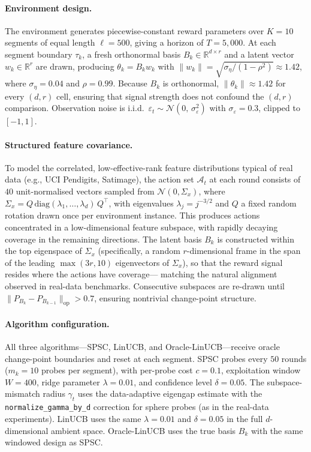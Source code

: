 \documentclass{article}
\newcommand{\R}{\mathbb{R}}
\newcommand{\cA}{\mathcal{A}}
\begin{document}
{\paragraph{Environment design.}
The environment generates piecewise-constant reward parameters over
$K = 10$ segments of equal length $\ell = 500$, giving a horizon of
$T = 5{,}000$.
At each segment boundary $\tau_k$, a fresh orthonormal basis
$B_k \in \R^{d \times r}$ and a latent vector $w_k \in \R^r$ are drawn,
producing $\theta_k = B_k w_k$ with
$\|w_k\| = \sqrt{\sigma_\eta / (1 - \rho^2)} \approx 1.42$,
where $\sigma_\eta = 0.04$ and $\rho = 0.99$.
Because $B_k$ is orthonormal, $\|\theta_k\| \approx 1.42$ for every
$(d,r)$ cell, ensuring that signal strength does not confound the
$(d,r)$ comparison.
Observation noise is i.i.d.\
$\varepsilon_t \sim \mathcal{N}(0,\, \sigma_\varepsilon^2)$ with
$\sigma_\varepsilon = 0.3$, clipped to $[-1, 1]$.

\paragraph{Structured feature covariance.}
To model the correlated, low-effective-rank feature distributions
typical of real data (e.g., UCI Pendigits, Satimage), the action set
$\cA_t$ at each round consists of $40$ unit-normalised vectors sampled
from $\mathcal{N}(0, \Sigma_x)$, where
$\Sigma_x = Q\, \mathrm{diag}(\lambda_1, \ldots, \lambda_d)\, Q^\top$,
with eigenvalues $\lambda_j = j^{-3/2}$ and $Q$ a fixed random
rotation drawn once per environment instance.
This produces actions concentrated in a low-dimensional feature
subspace, with rapidly decaying coverage in the remaining directions.
The latent basis $B_k$ is constructed within the top eigenspace of
$\Sigma_x$ (specifically, a random $r$-dimensional frame in the span
of the leading $\max(3r, 10)$ eigenvectors of $\Sigma_x$),
so that the reward signal resides where the actions have coverage---
matching the natural alignment observed in real-data benchmarks.
Consecutive subspaces are re-drawn until
$\|P_{B_k} - P_{B_{k-1}}\|_{\mathrm{op}} > 0.7$,
ensuring nontrivial change-point structure.

\paragraph{Algorithm configuration.}
All three algorithms---SPSC, LinUCB, and Oracle-LinUCB---receive
oracle change-point boundaries and reset at each segment.
SPSC probes every $50$ rounds ($m_k = 10$ probes per segment), with
per-probe cost $c = 0.1$, exploitation window $W = 400$,
ridge parameter $\lambda = 0.01$, and confidence level $\delta = 0.05$.
The subspace-mismatch radius $\gamma_t$ uses the data-adaptive
eigengap estimate with the \texttt{normalize\_gamma\_by\_d} correction
for sphere probes (as in the real-data experiments).
LinUCB uses the same $\lambda = 0.01$ and $\delta = 0.05$ in the full
$d$-dimensional ambient space.
Oracle-LinUCB uses the true basis $B_k$ with the same windowed design
as SPSC.

}
\end{document}
